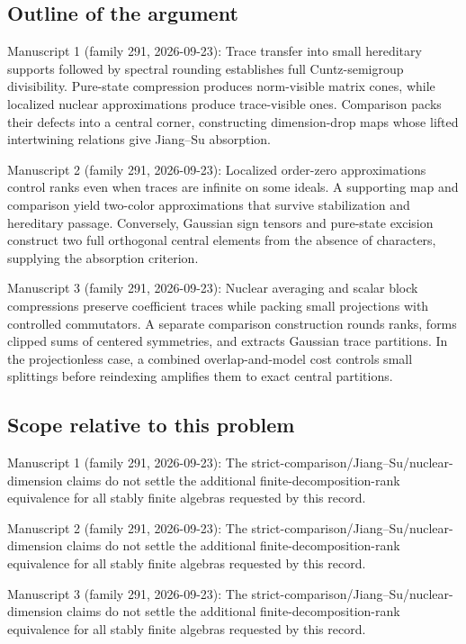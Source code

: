 \documentclass[11pt]{article}
\begin{document}
\subsection{Outline of the argument}
Manuscript 1 (family 291, 2026-09-23): Trace transfer into small hereditary supports followed by spectral rounding establishes full Cuntz-semigroup divisibility. Pure-state compression produces norm-visible matrix cones, while localized nuclear approximations produce trace-visible ones. Comparison packs their defects into a central corner, constructing dimension-drop maps whose lifted intertwining relations give Jiang--Su absorption.

Manuscript 2 (family 291, 2026-09-23): Localized order-zero approximations control ranks even when traces are infinite on some ideals. A supporting map and comparison yield two-color approximations that survive stabilization and hereditary passage. Conversely, Gaussian sign tensors and pure-state excision construct two full orthogonal central elements from the absence of characters, supplying the absorption criterion.

Manuscript 3 (family 291, 2026-09-23): Nuclear averaging and scalar block compressions preserve coefficient traces while packing small projections with controlled commutators. A separate comparison construction rounds ranks, forms clipped sums of centered symmetries, and extracts Gaussian trace partitions. In the projectionless case, a combined overlap-and-model cost controls small splittings before reindexing amplifies them to exact central partitions.

\subsection{Scope relative to this problem}
Manuscript 1 (family 291, 2026-09-23): The strict-comparison/Jiang–Su/nuclear-dimension claims do not settle the additional finite-decomposition-rank equivalence for all stably finite algebras requested by this record.

Manuscript 2 (family 291, 2026-09-23): The strict-comparison/Jiang–Su/nuclear-dimension claims do not settle the additional finite-decomposition-rank equivalence for all stably finite algebras requested by this record.

Manuscript 3 (family 291, 2026-09-23): The strict-comparison/Jiang–Su/nuclear-dimension claims do not settle the additional finite-decomposition-rank equivalence for all stably finite algebras requested by this record.
\end{document}
